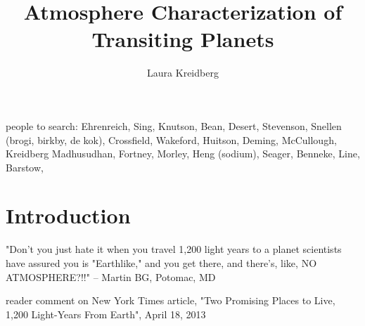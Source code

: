\documentclass[graybox,natbib,nosecnum]{svmult}
\begin{document}
\title*{Atmosphere Characterization of Transiting Planets}
\author{Laura Kreidberg}
%
%
\maketitle



people to search:
	Ehrenreich, Sing, Knutson, Bean, Desert, Stevenson, Snellen (brogi, birkby, de kok), Crossfield, Wakeford, Huitson, Deming, McCullough, Kreidberg 
	Madhusudhan, Fortney, Morley, Heng (sodium), Seager, Benneke, Line, Barstow,

\section{Introduction }
"Don't you just hate it when you travel 1,200 light years to a planet scientists have assured you is "Earthlike," and you get there, and there's, like, NO ATMOSPHERE?!!" -- Martin BG, Potomac, MD

reader comment on New York Times article, "Two Promising Places to Live, 1,200 Light-Years From Earth", April 18, 2013 
\end{document}
